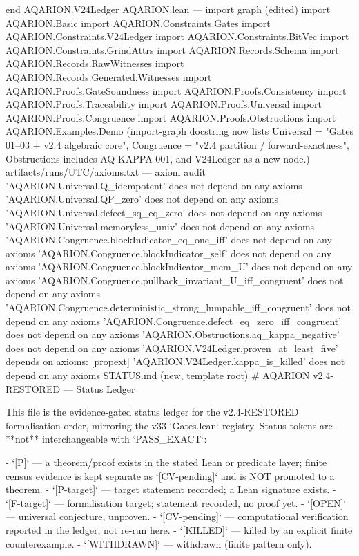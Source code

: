 end AQARION.V24Ledger
AQARION.lean — import graph (edited)
import AQARION.Basic
import AQARION.Constraints.Gates
import AQARION.Constraints.V24Ledger
import AQARION.Constraints.BitVec
import AQARION.Constraints.GrindAttrs
import AQARION.Records.Schema
import AQARION.Records.RawWitnesses
import AQARION.Records.Generated.Witnesses
import AQARION.Proofs.GateSoundness
import AQARION.Proofs.Consistency
import AQARION.Proofs.Traceability
import AQARION.Proofs.Universal
import AQARION.Proofs.Congruence
import AQARION.Proofs.Obstructions
import AQARION.Examples.Demo
(import-graph docstring now lists Universal = "Gates 01–03 + v2.4 algebraic core", Congruence = "v2.4 partition / forward-exactness", Obstructions includes AQ-KAPPA-001, and V24Ledger as a new node.)
artifacts/runs/UTC/axioms.txt — axiom audit
'AQARION.Universal.Q_idempotent' does not depend on any axioms
'AQARION.Universal.QP_zero' does not depend on any axioms
'AQARION.Universal.defect_sq_eq_zero' does not depend on any axioms
'AQARION.Universal.memoryless_univ' does not depend on any axioms
'AQARION.Congruence.blockIndicator_eq_one_iff' does not depend on any axioms
'AQARION.Congruence.blockIndicator_self' does not depend on any axioms
'AQARION.Congruence.blockIndicator_mem_U' does not depend on any axioms
'AQARION.Congruence.pullback_invariant_U_iff_congruent' does not depend on any axioms
'AQARION.Congruence.deterministic_strong_lumpable_iff_congruent' does not depend on any axioms
'AQARION.Congruence.defect_eq_zero_iff_congruent' does not depend on any axioms
'AQARION.Obstructions.aq_kappa_negative' does not depend on any axioms
'AQARION.V24Ledger.proven_at_least_five' depends on axioms: [propext]
'AQARION.V24Ledger.kappa_is_killed' does not depend on any axioms
STATUS.md (new, template root)
# AQARION v2.4-RESTORED — Status Ledger

This file is the evidence-gated status ledger for the v2.4-RESTORED
formalisation order, mirroring the v33 `Gates.lean` registry. Status tokens are
**not** interchangeable with `PASS_EXACT`:

- `[P]` — a theorem/proof exists in the stated Lean or predicate layer; finite
  census evidence is kept separate as `[CV-pending]` and is NOT promoted to a theorem.
- `[P-target]` — target statement recorded; a Lean signature exists.
- `[F-target]` — formalisation target; statement recorded, no proof yet.
- `[OPEN]` — universal conjecture, unproven.
- `[CV-pending]` — computational verification reported in the ledger, not re-run here.
- `[KILLED]` — killed by an explicit finite counterexample.
- `[WITHDRAWN]` — withdrawn (finite pattern only).

